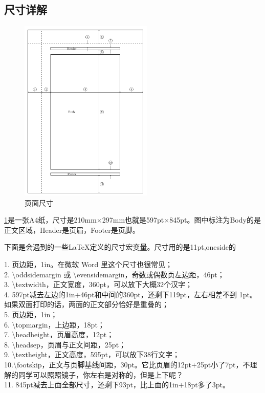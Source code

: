 \documentclass[UTF8]{article}
\begin{document}
\subsection{尺寸详解}
\begin{figure}[htbp]
	\centering
	\includegraphics[width=180pt]{layout.png}
	\caption{页面尺寸}
	\label{fig:layout}
\end{figure}
\ref{fig:layout}是一张A4纸，尺寸是210mm$\times$297mm也就是597pt$\times$845pt。图中标注为Body的是正文区域，Header是页眉，Footer是页脚。

下面是会遇到的一些\LaTeX 定义的尺寸宏变量。尺寸用的是11pt,oneside的


1. 页边距，1in。在微软 Word 里这个尺寸也很常见；\\
2. \textbackslash oddsidemargin 或 \textbackslash evensidemargin，奇数或偶数页左边距，46pt；\\
3. \textbackslash textwidth，正文宽度，360pt，可以放下大概32个汉字；\\
4. 597pt减去左边的1in+46pt和中间的360pt，还剩下119pt，左右相差不到 1pt。如果双面打印的话，两面的正文部分恰好是重叠的；\\
5. 页边距，1in；\\
6. \textbackslash topmargin，上边距，18pt；\\
7. \textbackslash headheight，页眉高度，12pt；\\
8. \textbackslash headsep，页眉与正文间距，25pt；\\
9. \textbackslash textheight，正文高度，595pt，可以放下38行文字；\\
10.\textbackslash footskip，正文与页脚基线间距，30pt。它比页眉的12pt+25pt小了7pt，不理解的同学可以照照镜子，你左右是对称的，但是上下呢？\\
11. 845pt减去上面全部尺寸，还剩下93pt，比上面的1in+18pt多了3pt。\\
\end{document}
